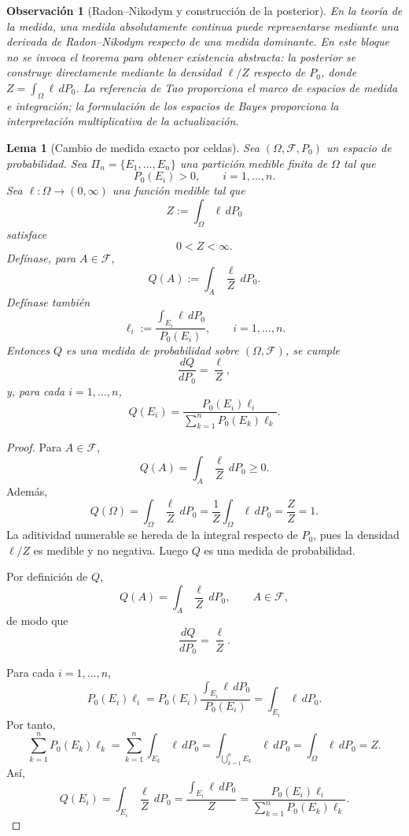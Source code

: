 \documentclass[12pt]{article}
\newtheorem{lema}{Lema}[section]
\newtheorem{observacion}{Observación}[section]
\begin{document}
\begin{observacion}[Radon--Nikodym y construcción de la posterior]
En la teoría de la medida, una medida absolutamente continua puede representarse mediante una derivada de Radon--Nikodym respecto de una medida dominante. En este bloque no se invoca el teorema para obtener existencia abstracta: la posterior se construye directamente mediante la densidad $\ell/Z$ respecto de $P_0$, donde $Z=\int_\Omega\ell\,dP_0$. La referencia de Tao proporciona el marco de espacios de medida e integración; la formulación de los espacios de Bayes proporciona la interpretación multiplicativa de la actualización.
\end{observacion}

\begin{lema}[Cambio de medida exacto por celdas]\label{lem:verosimilitud_cambio_medida}
Sea $(\Omega,\mathcal F,P_0)$ un espacio de probabilidad. Sea $\Pi_n=\{E_1,\dots,E_n\}$ una partición medible finita de $\Omega$ tal que
\[
P_0(E_i)>0,
\qquad i=1,\dots,n.
\]
Sea $\ell:\Omega\to(0,\infty)$ una función medible tal que
\[
Z:=\int_\Omega\ell\,dP_0
\]
satisface
\[
0<Z<\infty.
\]
Defínase, para $A\in\mathcal F$,
\[
Q(A):=\int_A\frac{\ell}{Z}\,dP_0.
\]
Defínase también
\[
\ell_i:=\frac{\displaystyle\int_{E_i}\ell\,dP_0}{P_0(E_i)},
\qquad i=1,\dots,n.
\]
Entonces $Q$ es una medida de probabilidad sobre $(\Omega,\mathcal F)$, se cumple
\[
\frac{dQ}{dP_0}=\frac{\ell}{Z},
\]
y, para cada $i=1,\dots,n$,
\[
Q(E_i)
=
\frac{P_0(E_i)\ell_i}{\displaystyle\sum_{k=1}^nP_0(E_k)\ell_k}.
\]
\end{lema}

\begin{proof}
Para $A\in\mathcal F$,
\[
Q(A)=\int_A\frac{\ell}{Z}\,dP_0\ge 0.
\]
Además,
\[
Q(\Omega)
=
\int_\Omega\frac{\ell}{Z}\,dP_0
=
\frac{1}{Z}\int_\Omega\ell\,dP_0
=
\frac{Z}{Z}
=1.
\]
La aditividad numerable se hereda de la integral respecto de $P_0$, pues la densidad $\ell/Z$ es medible y no negativa. Luego $Q$ es una medida de probabilidad.

Por definición de $Q$,
\[
Q(A)=\int_A\frac{\ell}{Z}\,dP_0,
\qquad A\in\mathcal F,
\]
de modo que
\[
\frac{dQ}{dP_0}=\frac{\ell}{Z}.
\]

Para cada $i=1,\dots,n$,
\[
P_0(E_i)\ell_i
=
P_0(E_i)
\frac{\displaystyle\int_{E_i}\ell\,dP_0}{P_0(E_i)}
=
\int_{E_i}\ell\,dP_0.
\]
Por tanto,
\[
\sum_{k=1}^nP_0(E_k)\ell_k
=
\sum_{k=1}^n\int_{E_k}\ell\,dP_0
=
\int_{\bigcup_{k=1}^nE_k}\ell\,dP_0
=
\int_\Omega\ell\,dP_0
=Z.
\]
Así,
\[
Q(E_i)
=
\int_{E_i}\frac{\ell}{Z}\,dP_0
=
\frac{\displaystyle\int_{E_i}\ell\,dP_0}{Z}
=
\frac{P_0(E_i)\ell_i}{\displaystyle\sum_{k=1}^nP_0(E_k)\ell_k}.
\]
\end{proof}
\end{document}
